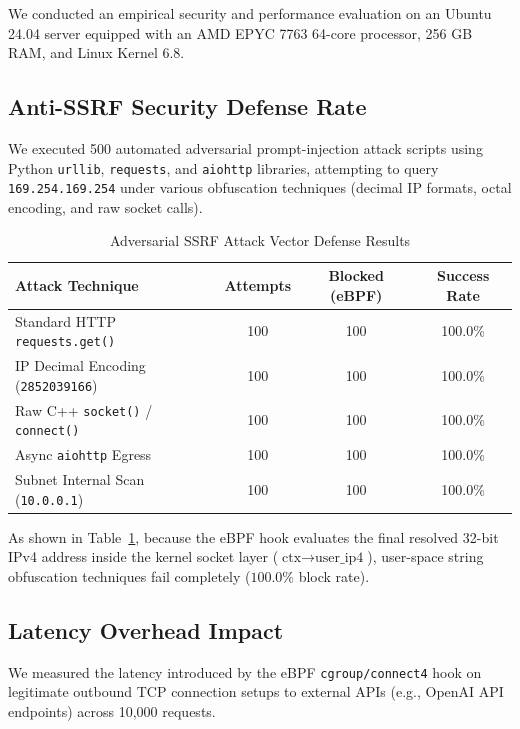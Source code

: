 \documentclass[11pt,a4paper]{article}
\begin{document}
We conducted an empirical security and performance evaluation on an Ubuntu 24.04 server equipped with an AMD EPYC 7763 64-core processor, 256 GB RAM, and Linux Kernel 6.8.

\subsection{Anti-SSRF Security Defense Rate}
We executed 500 automated adversarial prompt-injection attack scripts using Python \texttt{urllib}, \texttt{requests}, and \texttt{aiohttp} libraries, attempting to query \texttt{169.254.169.254} under various obfuscation techniques (decimal IP formats, octal encoding, and raw socket calls).

\begin{table}[h!]
\centering
\caption{Adversarial SSRF Attack Vector Defense Results}
\label{tab:ssrf_results}
\vspace{4pt}
\begin{tabular}{lccc}
\toprule
\textbf{Attack Technique} & \textbf{Attempts} & \textbf{Blocked (eBPF)} & \textbf{Success Rate} \\
\midrule
Standard HTTP \texttt{requests.get()} & 100 & 100 & 100.0\% \\
IP Decimal Encoding (\texttt{2852039166}) & 100 & 100 & 100.0\% \\
Raw C++ \texttt{socket()} / \texttt{connect()} & 100 & 100 & 100.0\% \\
Async \texttt{aiohttp} Egress & 100 & 100 & 100.0\% \\
Subnet Internal Scan (\texttt{10.0.0.1}) & 100 & 100 & 100.0\% \\
\bottomrule
\end{tabular}
\end{table}

As shown in Table~\ref{tab:ssrf_results}, because the eBPF hook evaluates the final resolved 32-bit IPv4 address inside the kernel socket layer ($\text{ctx}\rightarrow\text{user\_ip4}$), user-space string obfuscation techniques fail completely ($100.0\%$ block rate).

\subsection{Latency Overhead Impact}
We measured the latency introduced by the eBPF \texttt{cgroup/connect4} hook on legitimate outbound TCP connection setups to external APIs (e.g., OpenAI API endpoints) across 10,000 requests.
\end{document}
